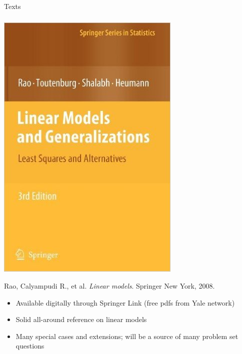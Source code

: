 \begin{frame}[fragile] \frametitle{}

\begin{flushright}
{\color{yaleblue}\sc\fontsize{1cm}{0cm}\selectfont Texts}
\end{flushright}

\end{frame}

\begin{frame}[fragile] \frametitle{}

\noindent
\begin{minipage}{0.5\textwidth}
\includegraphics[width=0.9\linewidth]{img/rao.jpg}
\end{minipage}%
\begin{minipage}{0.5\textwidth}
Rao, Calyampudi R., et al. {\it Linear models}. Springer New York, 2008. \\
\begin{itemize}
\item Available digitally through Springer Link (free pdfs from Yale network)
\item Solid all-around reference on linear models
\item Many special cases and extensions; will be a source of many problem set questions
\end{itemize}
\end{minipage}

\end{frame}

